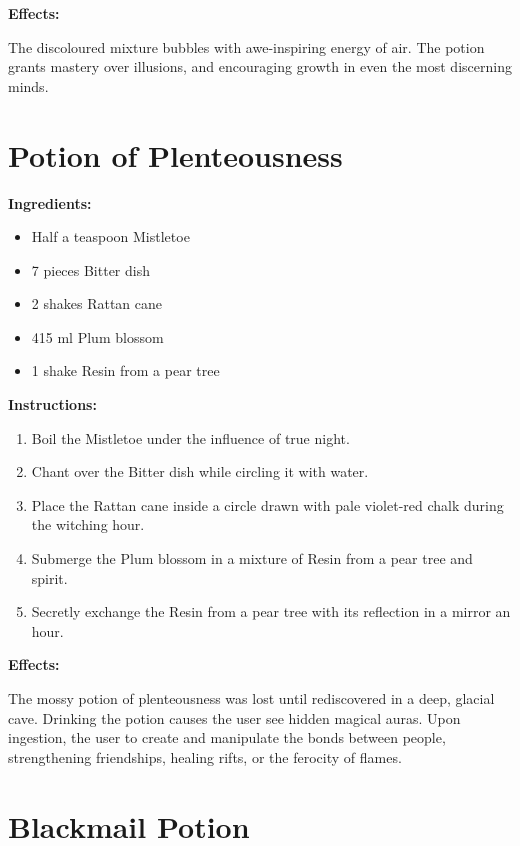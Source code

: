 \documentclass{article}
\begin{document}
\textbf{Effects:}

The discoloured mixture bubbles with awe-inspiring energy of air. The potion grants mastery over illusions, and encouraging growth in even the most discerning minds.

\newpage
\section*{Potion of Plenteousness}

\textbf{Ingredients:}

\begin{itemize}
  \item Half a teaspoon Mistletoe
  \item 7 pieces Bitter dish
  \item 2 shakes Rattan cane
  \item 415 ml Plum blossom
  \item 1 shake Resin from a pear tree
\end{itemize}

\textbf{Instructions:}

\begin{enumerate}
  \item Boil the Mistletoe under the influence of true night.
  \item Chant over the Bitter dish while circling it with water.
  \item Place the Rattan cane inside a circle drawn with pale violet-red chalk during the witching hour.
  \item Submerge the Plum blossom in a mixture of Resin from a pear tree and spirit.
  \item Secretly exchange the Resin from a pear tree with its reflection in a mirror an hour.
\end{enumerate}

\textbf{Effects:}

The mossy potion of plenteousness was lost until rediscovered in a deep, glacial cave. Drinking the potion causes the user see hidden magical auras. Upon ingestion, the user to create and manipulate the bonds between people, strengthening friendships, healing rifts, or the ferocity of flames.

\newpage
\section*{Blackmail Potion}
\end{document}
